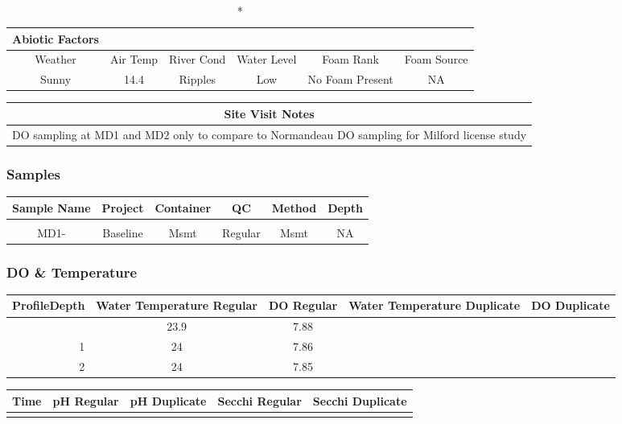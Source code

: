 \documentclass[
  letterpaper,
  DIV=11,
  numbers=noendperiod]{scrartcl}
\begin{document}
\begin{longtable*}{cccccc}
\caption*{
{\large Abiotic Factors}
} \\ 
\toprule
Weather & Air Temp & River Cond & Water Level & Foam Rank & Foam Source \\ 
\midrule\addlinespace[2.5pt]
Sunny & 14.4 & Ripples & Low & No Foam Present & NA \\ 
\bottomrule
\end{longtable*}

\begin{longtable*}{c}
\toprule
Site Visit Notes \\ 
\midrule\addlinespace[2.5pt]
DO sampling at MD1 and MD2 only  to compare to Normandeau DO sampling for Milford license study \\ 
\bottomrule
\end{longtable*}

\subsubsection{Samples}

\begin{longtable*}{cccccc}
\toprule
Sample Name & Project & Container & QC & Method & Depth \\ 
\midrule\addlinespace[2.5pt]
 \\ 
\midrule\addlinespace[2.5pt]
MD1- & Baseline & Msmt & Regular & Msmt & NA \\ 
\bottomrule
\end{longtable*}

\subsubsection{DO \& Temperature}

\begin{longtable*}{rcccc}
\toprule
ProfileDepth & Water Temperature Regular & DO Regular & Water Temperature Duplicate & DO Duplicate \\ 
\midrule{} & 23.9 & 7.88 &  &  \\ 
1 & 24 & 7.86 &  &  \\ 
2 & 24 & 7.85 &  &  \\ 
\bottomrule
\end{longtable*}

\begin{longtable*}{lllll}
\toprule
Time & pH Regular & pH Duplicate & Secchi Regular & Secchi Duplicate \\ 
\midrule\addlinespace[2.5pt]
\bottomrule
\end{longtable*}
\end{document}
